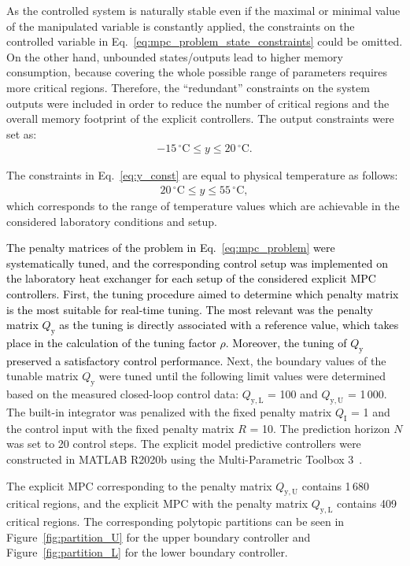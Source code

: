 \documentclass[preprint,12pt]{elsarticle}
\newcommand{\change}[1]{\textcolor{black}{#1}}
\begin{document}
As the controlled system is naturally stable even if the maximal or minimal value of the manipulated variable is constantly applied, the constraints on the controlled variable in Eq.~\eqref{eq:mpc_problem_state_constraints} could be omitted. On the other hand, unbounded states/outputs lead to higher memory consumption, because covering the whole possible range of parameters requires more critical regions. Therefore, the ``redundant'' constraints on the system outputs were included in order to reduce the number of critical regions and the overall memory footprint of the explicit controllers. The output constraints were set as: 
\begin{eqnarray}
	\label{eq:y_const}
	-15\,^{\circ}\mathrm{C} \le y \le 20\,^{\circ}\mathrm{C}.
\end{eqnarray}	

The constraints in Eq.~\eqref{eq:y_const} are equal to physical temperature as follows:
\begin{eqnarray}
	\label{eq:Y_const}
	20\,^{\circ}\mathrm{C} \le y \le 55\,^{\circ}\mathrm{C},
\end{eqnarray}
which corresponds to the range of temperature values which are achievable in the considered laboratory conditions and setup.		 

\change{The penalty matrices of the problem in Eq.~\eqref{eq:mpc_problem} were systematically tuned, and the corresponding control setup was implemented on the laboratory heat exchanger for each setup of the considered explicit MPC controllers. 
First, the tuning procedure aimed to determine which penalty matrix is the most suitable for real-time tuning. The most relevant was the penalty matrix $Q_\mathrm{y}$ as the tuning is directly associated with a reference value, which takes place in the calculation of the tuning factor $\rho$. Moreover, the tuning of $Q_\mathrm{y}$ preserved a satisfactory control performance.} Next, the boundary values of the tunable matrix $Q_\mathrm{y}$ were tuned until the following limit values were determined based on the measured closed-loop control data: $Q_\mathrm{y, L}$ = 100 and $Q_\mathrm{y, U}$ = 1\,000. The built-in integrator was penalized with the fixed penalty matrix $Q_\mathrm{I}$ = 1 and the control input with the fixed penalty matrix $R$ = 10. The prediction horizon $N$ was set to 20 control steps. The explicit model predictive controllers were constructed in MATLAB R2020b using the Multi-Parametric Toolbox 3~\cite{mpt_conf}. 

The explicit MPC corresponding to the penalty matrix $Q_\mathrm{y, U}$ contains 1\,680 critical regions, and the explicit MPC with the penalty matrix $Q_\mathrm{y, L}$ contains 409 critical regions. The corresponding polytopic partitions can be seen in Figure~\ref{fig:partition_U} for the upper boundary controller and Figure~\ref{fig:partition_L} for the lower boundary controller.  
\end{document}
